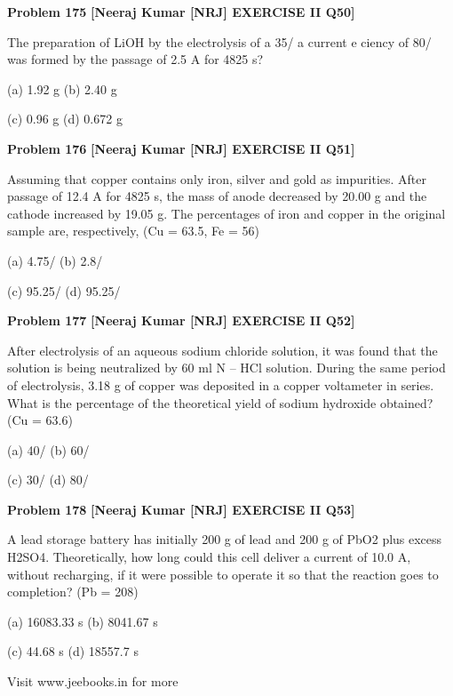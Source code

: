 \begin{problembox}
\textbf{Problem 175} \hfill \textbf{[Neeraj Kumar [NRJ] EXERCISE II Q50]}
\label{q:ext-nrj_all_questions-175}

The preparation of LiOH by the electrolysis of a 
35/%
a current e   ciency of 80/%
was formed by the passage of 2.5 A for 4825 s?
 
 (a) 1.92 g 
(b) 2.40 g
 
 (c) 0.96 g 
(d) 0.672 g
\end{problembox}

\begin{problembox}
\textbf{Problem 176} \hfill \textbf{[Neeraj Kumar [NRJ] EXERCISE II Q51]}
\label{q:ext-nrj_all_questions-176}

Assuming that copper contains only iron, silver 
and gold as impurities. After passage of 12.4 A for 
4825 s, the mass of anode decreased by 20.00 g and 
the cathode increased by 19.05 g. The percentages 
of iron and copper in the original sample are, 
respectively, (Cu = 63.5, Fe = 56)
 
 (a) 4.75/%
(b) 2.8/%
 
 (c) 95.25/%
(d) 95.25/%
\end{problembox}

\begin{problembox}
\textbf{Problem 177} \hfill \textbf{[Neeraj Kumar [NRJ] EXERCISE II Q52]}
\label{q:ext-nrj_all_questions-177}

After electrolysis of an aqueous sodium chloride 
solution, it was found that the solution is being 
neutralized by 60 ml N -- HCl solution. During the 
same period of electrolysis, 3.18 g of copper was 
deposited in a copper voltameter in series. What is 
the percentage of the theoretical yield of sodium 
hydroxide obtained? (Cu = 63.6)
 
 (a) 40/%
(b) 60/%
 
 (c) 30/%
(d) 80/%
\end{problembox}

\begin{problembox}
\textbf{Problem 178} \hfill \textbf{[Neeraj Kumar [NRJ] EXERCISE II Q53]}
\label{q:ext-nrj_all_questions-178}

A lead storage battery has initially 200  g of 
lead and 200 g of PbO2 plus excess H2SO4. 
Theoretically, how long could this cell deliver a 
current of 10.0 A, without recharging, if it were 
possible to operate it so that the reaction goes to 
completion? (Pb = 208)
 
 (a) 16083.33 s 
(b) 8041.67 s
 
 (c) 44.68 s 
(d) 18557.7 s
 
 
Visit www.jeebooks.in for more
\end{problembox}

